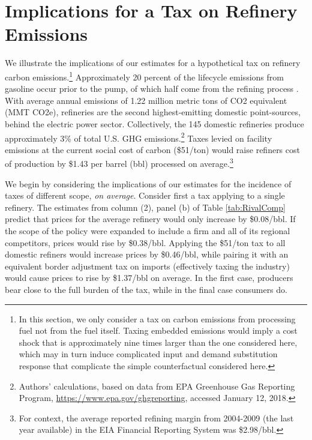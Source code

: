 \documentclass[12pt]{article}
\begin{document}
\section{Implications for a Tax on Refinery Emissions \label{sec:CarbonTax}}
We illustrate the implications of our estimates for a hypothetical tax on refinery carbon emissions.\footnote{In this section, we only consider a tax on carbon emissions from processing fuel not from the fuel itself. Taxing embedded emissions would imply a cost shock that is approximately nine times larger than the one considered here, which may in turn induce complicated input and demand substitution response that complicate the simple counterfactual considered here.} Approximately 20 percent of the lifecycle emissions from gasoline occur prior to the pump, of which half come from the refining process \citep{CRSlifecycle}. With average annual emissions of 1.22 million metric tons of CO2 equivalent (MMT CO2e), refineries are the second highest-emitting domestic point-sources, behind the electric power sector.  Collectively, the 145 domestic refineries produce approximately 3\% of total U.S. GHG emissions.\footnote{Authors' calculations, based on data from EPA Greenhouse Gas Reporting Program, \url{https://www.epa.gov/ghgreporting}, accessed January 12, 2018.} Taxes levied on facility emissions at the current social cost of carbon (\$51/ton) would raise refiners cost of production by \$1.43 per barrel (bbl) processed on average.\footnote{For context, the average reported refining margin from 2004-2009 (the last year available) in the EIA Financial Reporting System was \$2.98/bbl.}

We begin by considering the implications of our estimates for the incidence of taxes of different scope, \emph{on average}. Consider first a tax applying to a single refinery. The estimates from column (2), panel (b) of Table \ref{tab:RivalComp} predict that prices for the average refinery would only increase by \$0.08/bbl. If the scope of the policy were expanded to include a firm and all of its regional competitors, prices would rise by \$0.38/bbl. Applying the \$51/ton tax to all domestic refiners would increase prices by \$0.46/bbl, while pairing it with an equivalent border adjustment tax on imports (effectively taxing the industry) would cause prices to rise by \$1.37/bbl on average.  In the first case, producers bear close to the full burden of the tax, while in the final case consumers do.
\end{document}
